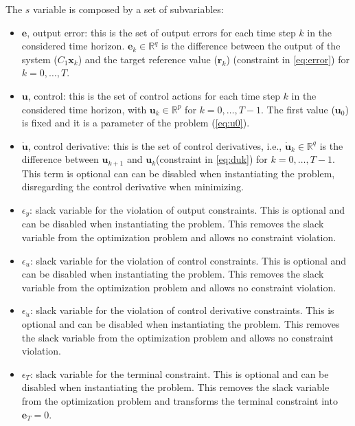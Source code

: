\documentclass[10pt,a4paper]{article}
\newcommand{\xk}{\ensuremath{\bm{x}_k}\xspace}
\newcommand{\uk}{\ensuremath{\bm{u}_k}\xspace}
\newcommand{\ukk}{\ensuremath{\bm{u}_{k+1}}\xspace}
\newcommand{\uu}[1]{\ensuremath{\bm{u}_{#1}}\xspace}
\newcommand{\duk}{\ensuremath{\bm{\dot{u}}_k}\xspace}
\newcommand{\ek}{\ensuremath{\bm{e}_k}\xspace}
\newcommand{\ee}[1]{\ensuremath{\bm{e}_{#1}}\xspace}
\newcommand{\rk}{\ensuremath{\bm{r}_k}\xspace}
\newcommand{\epsy}{\ensuremath{\epsilon_{y}}\xspace}
\newcommand{\epsu}{\ensuremath{\epsilon_{u}}\xspace}
\newcommand{\epsdu}{\ensuremath{\epsilon_{\dot{u}}}\xspace}
\newcommand{\epst}{\ensuremath{\epsilon_T}\xspace}
\newcommand{\R}{\ensuremath{\mathbb{R}\xspace}}
\newcommand{\Co}{\ensuremath{C_1}}
\begin{document}
The $s$ variable is composed by a set of subvariables:
\begin{itemize}
    \item $\bm{e}$, output error: this is the set of output errors for each time step $k$ in the considered time horizon. $\ek \in \R^q$ is the difference between the output of the system ($\Co\xk$) and the target reference value ($\rk$) (constraint in \cref{eq:error}) for $k = 0,\dots,T$.
    \item $\bm{u}$, control: this is the set of control actions for each time step $k$ in the considered time horizon, with $\uk \in \R^p$ for $k = 0,\dots,T-1$. The first value (\uu{0}) is fixed and it is a parameter of the problem (\cref{eq:u0}).
    \item $\bm{\dot{u}}$, control derivative: this is the set of control derivatives, i.e., $\duk \in \R^q$ is the difference between \ukk and \uk (constraint in \cref{eq:duk}) for $k = 0,\dots,T-1$. This term is optional can can be disabled when instantiating the problem, disregarding the control derivative when minimizing.
    \item \epsy: slack variable for the violation of output constraints. This is optional and can be disabled when instantiating the problem. This removes the slack variable from the optimization problem and allows no constraint violation.
    \item \epsu: slack variable for the violation of control constraints. This is optional and can be disabled when instantiating the problem. This removes the slack variable from the optimization problem and allows no constraint violation.
    \item \epsdu: slack variable for the violation of control derivative constraints. This is optional and can be disabled when instantiating the problem. This removes the slack variable from the optimization problem and allows no constraint violation.
	\item \epst: slack variable for the terminal constraint. This is optional and can be disabled when instantiating the problem. This removes the slack variable from the optimization problem and transforms the terminal constraint into $\ee{T} = 0$.
\end{itemize}
\end{document}
